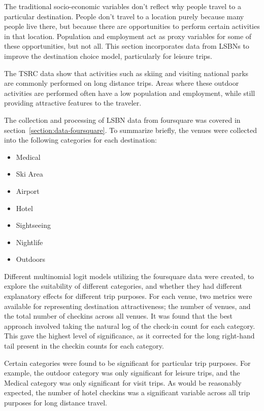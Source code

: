 The traditional socio-economic variables don't reflect why people travel to a particular destination. People don't travel to a location purely because many people live there, but because there are opportunities to perform certain activities in that location. Population and employment act as proxy variables for some of these opportunities, but not all. This section incorporates data from LSBNs to improve the destination choice model, particularly for leisure trips.  

The TSRC data show that activities such as skiing and visiting national parks are commonly performed on long distance trips. Areas where these outdoor activities are performed often have a low population and employment, while still providing attractive features to the traveler.

The collection and processing of LSBN data from foursquare was covered in section~\ref{section:data-foursquare}. To summarize briefly, the venues were collected into the following categories for each destination:
\begin{multicols}{2}
\raggedcolumns
\begin{itemize}
\item Medical
\item Ski Area
\item Airport
\item Hotel
\item Sightseeing
\item Nightlife
\item Outdoors
\end{itemize}
\end{multicols}


Different multinomial logit models utilizing the foursquare data were created, to explore the suitability of different categories, and whether they had different explanatory effects for different trip purposes. For each venue, two metrics were available for representing destination attractiveness; the number of venues, and the total number of checkins across all venues.
It was found that the best approach involved taking the natural log of the check-in count for each category. This gave the highest level of significance, as it corrected for the long right-hand tail present in the checkin counts for each category.

Certain categories were found to be significant for particular trip purposes. For example, the outdoor category was only significant for leisure trips, and the Medical category was only significant for visit trips. As would be reasonably expected, the number of hotel checkins was a significant variable across all trip purposes for long distance travel.

